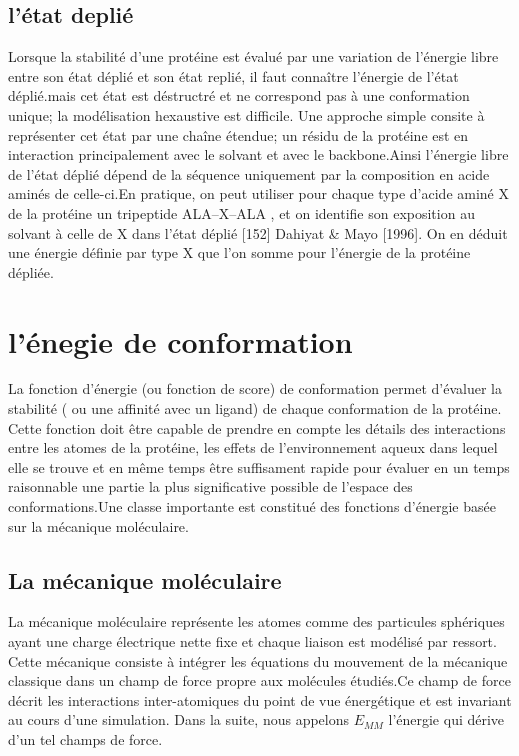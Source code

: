 \subsection{l'état deplié }
Lorsque la stabilité d'une protéine est évalué par une variation de l'énergie libre entre son état déplié et son état replié, il faut connaître l'énergie de l'état déplié.mais cet état est déstructré et ne correspond pas à une conformation unique; la modélisation hexaustive est difficile. Une approche simple consite à représenter cet état par une chaîne étendue; un résidu de la protéine est en interaction principalement avec le solvant et avec le backbone.Ainsi l'énergie libre de l'état déplié dépend de la séquence uniquement par la composition en acide aminés de celle-ci.En pratique, on peut utiliser pour chaque type d'acide aminé X de la protéine  un tripeptide ALA--X--ALA , et on identifie son exposition au solvant à celle de X dans l'état déplié [152] Dahiyat & Mayo [1996]. On en déduit une énergie définie par type X que l'on somme pour l'énergie de la protéine dépliée. 

\section{l'énegie de conformation}

La fonction d'énergie (ou fonction de score) de conformation permet d'évaluer la stabilité ( ou une affinité avec un ligand) de chaque conformation de la protéine. Cette fonction doit être capable de prendre en compte les détails des interactions entre les atomes de la protéine, les effets de l'environnement aqueux  dans lequel elle se trouve et en même temps être suffisament rapide pour évaluer en un temps raisonnable une partie la plus significative possible de l'espace des conformations.Une classe importante est constitué des fonctions d'énergie basée sur la mécanique moléculaire.

\subsection{La mécanique moléculaire}
La mécanique moléculaire représente les atomes comme des particules sphériques ayant une charge électrique nette fixe et chaque liaison est modélisé par ressort.
Cette mécanique consiste à intégrer les équations du mouvement de la mécanique classique dans un champ de force propre aux molécules étudiés.Ce champ de force décrit les interactions inter-atomiques du point de vue énergétique et est invariant au cours d'une simulation.
Dans la suite, nous appelons $E_{MM}$ l'énergie qui dérive d'un tel champs de force.

